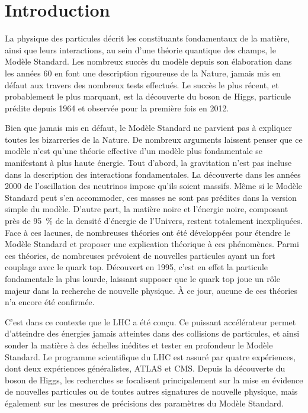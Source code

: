 \chapter*{Introduction}


La physique des particules décrit les constituants fondamentaux de la matière, ainsi que leurs interactions, au sein d'une théorie quantique des champs, le Modèle Standard. Les nombreux succès du modèle depuis son élaboration dans les années 60 en font une description rigoureuse de la Nature, jamais mis en défaut aux travers des nombreux tests effectués. Le succès le plus récent, et probablement le plus marquant, est la découverte du boson de Higgs, particule prédite depuis 1964 et observée pour la première fois en 2012.

Bien que jamais mis en défaut, le Modèle Standard ne parvient pas à expliquer toutes les bizarreries de la Nature. De nombreux arguments laissent penser que ce modèle n'est qu'une théorie effective d'un modèle plus fondamentale se manifestant à plus haute énergie. Tout d'abord, la gravitation n'est pas incluse dans la description des interactions fondamentales. La découverte dans les années 2000 de l'oscillation des neutrinos impose qu'ils soient massifs. Même si le Modèle Standard peut s'en accommoder, ces masses ne sont pas prédites dans la version simple du modèle. D'autre part, la matière noire et l'énergie noire, composant près de \SI{95}{\percent} de la densité d'énergie de l'Univers, restent totalement inexpliquées. Face à ces lacunes, de nombreuses théories ont été développées pour étendre le Modèle Standard et proposer une explication théorique à ces phénomènes. Parmi ces théories, de nombreuses prévoient de nouvelles particules ayant un fort couplage avec le quark top. Découvert en 1995, c'est en effet la particule fondamentale la plus lourde, laissant supposer que le quark top joue un rôle majeur dans la recherche de nouvelle physique. À ce jour, aucune de ces théories n'a encore été confirmée.

\smallskip

C'est dans ce contexte que le LHC a été conçu. Ce puissant accélérateur permet d'atteindre des énergies jamais atteintes dans des collisions de particules, et ainsi sonder la matière à des échelles inédites et tester en profondeur le Modèle Standard. Le programme scientifique du LHC est assuré par quatre expériences, dont deux expériences généralistes, ATLAS et CMS. Depuis la découverte du boson de Higgs, les recherches se focalisent principalement sur la mise en évidence de nouvelles particules ou de toutes autres signatures de nouvelle physique, mais également sur les mesures de précisions des paramètres du Modèle Standard.

